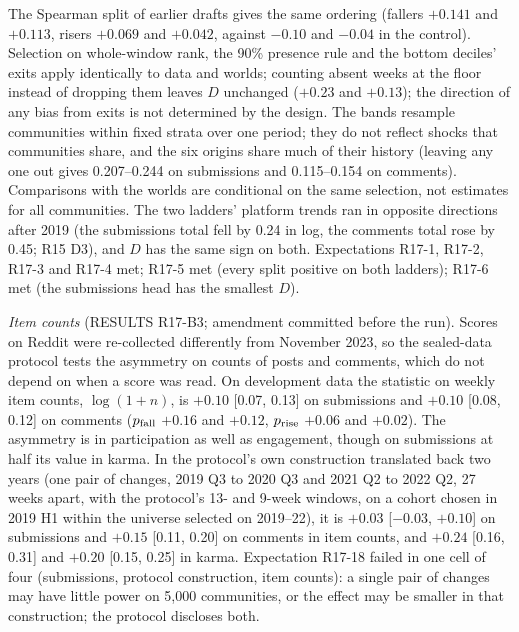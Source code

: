 \documentclass[10pt]{article}
\begin{document}
The Spearman split of earlier drafts gives the same ordering (fallers $+0.141$ and $+0.113$, risers $+0.069$ and $+0.042$, against $-0.10$ and $-0.04$ in the control). Selection on whole-window rank, the 90\% presence rule and the bottom deciles' exits apply identically to data and worlds; counting absent weeks at the floor instead of dropping them leaves $D$ unchanged ($+0.23$ and $+0.13$); the direction of any bias from exits is not determined by the design. The bands resample communities within fixed strata over one period; they do not reflect shocks that communities share, and the six origins share much of their history (leaving any one out gives 0.207--0.244 on submissions and 0.115--0.154 on comments). Comparisons with the worlds are conditional on the same selection, not estimates for all communities. The two ladders' platform trends ran in opposite directions after 2019 (the submissions total fell by 0.24 in log, the comments total rose by 0.45; R15 D3), and $D$ has the same sign on both. Expectations R17-1, R17-2, R17-3 and R17-4 met; R17-5 met (every split positive on both ladders); R17-6 met (the submissions head has the smallest $D$).

\emph{Item counts} (RESULTS R17-B3; amendment committed before the run). Scores on Reddit were re-collected differently from November 2023, so the sealed-data protocol tests the asymmetry on counts of posts and comments, which do not depend on when a score was read. On development data the statistic on weekly item counts, $\log(1+n)$, is $+0.10$ [0.07, 0.13] on submissions and $+0.10$ [0.08, 0.12] on comments ($p_{\rm fall}$ $+0.16$ and $+0.12$, $p_{\rm rise}$ $+0.06$ and $+0.02$). The asymmetry is in participation as well as engagement, though on submissions at half its value in karma. In the protocol's own construction translated back two years (one pair of changes, 2019 Q3 to 2020 Q3 and 2021 Q2 to 2022 Q2, 27 weeks apart, with the protocol's 13- and 9-week windows, on a cohort chosen in 2019 H1 within the universe selected on 2019--22), it is $+0.03$ [$-0.03$, $+0.10$] on submissions and $+0.15$ [0.11, 0.20] on comments in item counts, and $+0.24$ [0.16, 0.31] and $+0.20$ [0.15, 0.25] in karma. Expectation R17-18 failed in one cell of four (submissions, protocol construction, item counts): a single pair of changes may have little power on 5,000 communities, or the effect may be smaller in that construction; the protocol discloses both.
\end{document}
